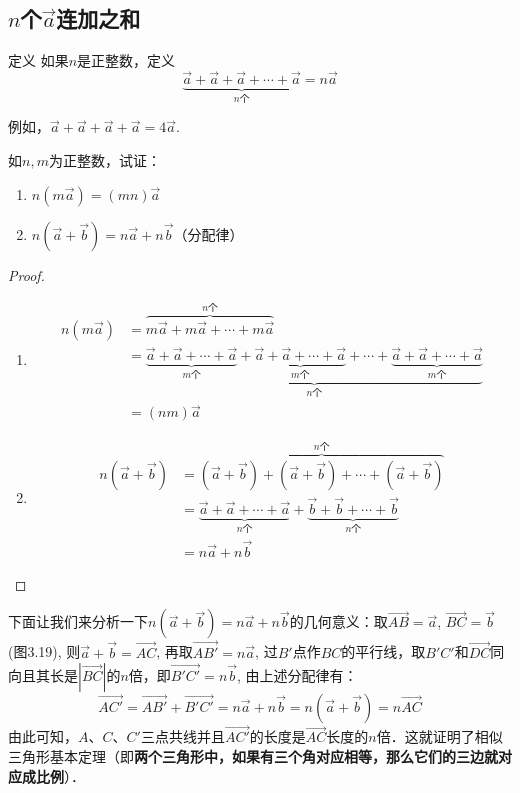 \subsection{$n$个$\vec{a}$连加之和}

\begin{blk}{定义}
如果$n$是正整数，定义
\[\underbrace{\vec{a}+\vec{a}+\vec{a}+\cdots+\vec{a}}_{\text{$n$个}}=n\vec{a}\] 
\end{blk}

例如，$\vec{a}+\vec{a}+\vec{a}+\vec{a}=4\vec{a}$.

\begin{example}
如$n,m$为正整数，试证：
\begin{enumerate}
    \item $n\left(m\vec{a}\right)=(mn)\vec{a}$
    \item $n\left(\vec{a}+\vec{b}\right)=n\vec{a}+n\vec{b}$（分配律）
\end{enumerate}
\end{example}   

\begin{proof}
\begin{enumerate}
    \item 
\[\begin{split}
     n\left(m\vec{a}\right)&=\overbrace{m\vec{a}+m\vec{a}+\cdots +m\vec{a}}^{n\text{个}}\\
&=\underbrace{\underbrace{\vec{a}+\vec{a}+\cdots+\vec{a}}_{m\text{个}}+\underbrace{\vec{a}+\vec{a}+\cdots+\vec{a}}_{m\text{个}}+\cdots +\underbrace{\vec{a}+\vec{a}+\cdots+\vec{a}}_{m\text{个}}}_{n\text{个}}\\
&=(nm)\vec{a} 
\end{split}\]
\item 
\[\begin{split}
     n\left(\vec{a}+\vec{b}\right)&=\overbrace{\left(\vec{a}+\vec{b}\right)+\left(\vec{a}+\vec{b}\right)+\cdots +\left(\vec{a}+\vec{b}\right)}^{n\text{个}}\\
   &=  \underbrace{\vec{a}+\vec{a}+\cdots+\vec{a}}_{n\text{个}}+\underbrace{\vec{b}+\vec{b}+\cdots+\vec{b}}_{n\text{个}}\\
     &=n\vec{a}+n\vec{b}
\end{split}\]
\end{enumerate}    
\end{proof}

下面让我们来分析一下$n\left(\vec{a}+\vec{b}\right)=n\vec{a}+n\vec{b}$的几何意义：取$\Vec{AB}=\vec{a}$, $\Vec{BC}=\vec{b}$ (图3.19), 则$\vec{a}+\vec{b}=\Vec{AC}$, 再取$\Vec{AB'}=n\vec{a}$, 过$B'$点作$BC$的平行线，取$B'C'$和$\Vec{DC}$同向且其长是$|\Vec{BC}|$的$n$倍，即$\Vec{B'C'}=n\vec{b}$, 由上述分配律有：
\[\Vec{AC'}=\Vec{AB'}+\Vec{B'C'}=n\vec{a}+n\vec{b}=n\left(\vec{a}+\vec{b}\right)=n\Vec{AC}\]
由此可知，$A$、$C$、$C'$三点共线并且$\Vec{AC'}$的长度是$\Vec{AC}$长度的$n$倍．这就证明了相似三角形基本定理（即\textbf{两个三角形中，如果有三个角对应相等，那么它们的三边就对应成比例}）．


